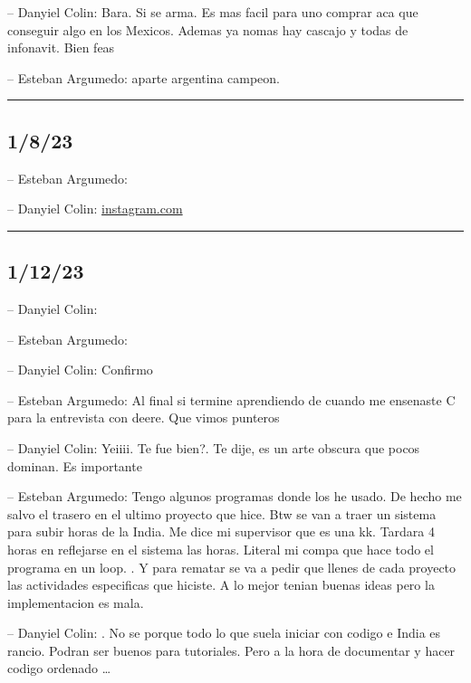 -- Danyiel Colin: Bara. Si se arma. Es mas facil para uno comprar aca
que conseguir algo en los Mexicos. Ademas ya nomas hay cascajo y todas
de infonavit. Bien feas

-- Esteban Argumedo: aparte argentina campeon.

\begin{center}\rule{0.5\linewidth}{0.5pt}\end{center}

\hypertarget{section-175}{%
\subsection{1/8/23}\label{section-175}}

-- Esteban Argumedo:

-- Danyiel Colin:
\href{https://www.instagram.com/reel/CmpAy2NrmVE/?igshid=MDJmNzVkMjY=}{instagram.com}

\begin{center}\rule{0.5\linewidth}{0.5pt}\end{center}

\hypertarget{section-176}{%
\subsection{1/12/23}\label{section-176}}

-- Danyiel Colin:

-- Esteban Argumedo:

-- Danyiel Colin: Confirmo

-- Esteban Argumedo: Al final si termine aprendiendo de cuando me
ensenaste C para la entrevista con deere. Que vimos punteros

-- Danyiel Colin: Yeiiii. Te fue bien?. Te dije, es un arte obscura que
pocos dominan. Es importante

-- Esteban Argumedo: Tengo algunos programas donde los he usado. De
hecho me salvo el trasero en el ultimo proyecto que hice. Btw se van a
traer un sistema para subir horas de la India. Me dice mi supervisor que
es una kk. Tardara 4 horas en reflejarse en el sistema las horas.
Literal mi compa que hace todo el programa en un loop. . Y para rematar
se va a pedir que llenes de cada proyecto las actividades especificas
que hiciste. A lo mejor tenian buenas ideas pero la implementacion es
mala.

-- Danyiel Colin: . No se porque todo lo que suela iniciar con codigo e
India es rancio. Podran ser buenos para tutoriales. Pero a la hora de
documentar y hacer codigo ordenado \ldots{}


